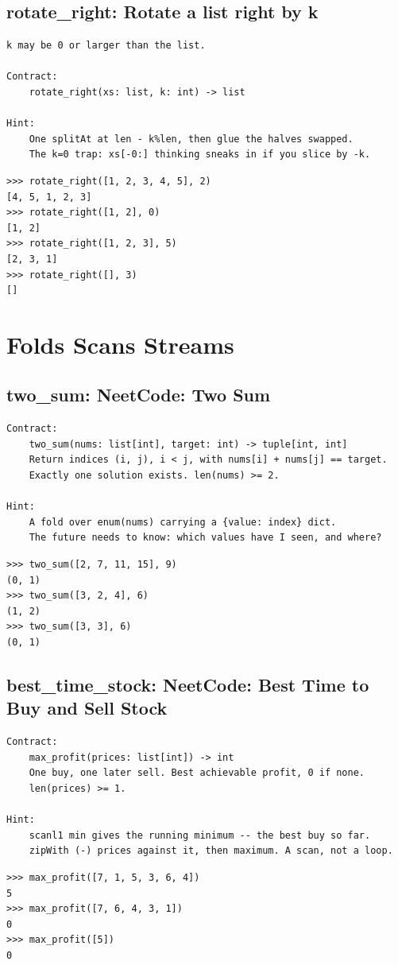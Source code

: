 \documentclass[10pt,letterpaper]{book}
\begin{document}
\section{rotate\_right: Rotate a list right by k}
\begin{lstlisting}[style=ex]
k may be 0 or larger than the list.

Contract:
    rotate_right(xs: list, k: int) -> list

Hint:
    One splitAt at len - k%len, then glue the halves swapped.
    The k=0 trap: xs[-0:] thinking sneaks in if you slice by -k.
\end{lstlisting}
\begin{lstlisting}[style=ex]
>>> rotate_right([1, 2, 3, 4, 5], 2)
[4, 5, 1, 2, 3]
>>> rotate_right([1, 2], 0)
[1, 2]
>>> rotate_right([1, 2, 3], 5)
[2, 3, 1]
>>> rotate_right([], 3)
[]
\end{lstlisting}
\chapter{Folds Scans Streams}

\section{two\_sum: NeetCode: Two Sum}
\begin{lstlisting}[style=ex]
Contract:
    two_sum(nums: list[int], target: int) -> tuple[int, int]
    Return indices (i, j), i < j, with nums[i] + nums[j] == target.
    Exactly one solution exists. len(nums) >= 2.

Hint:
    A fold over enum(nums) carrying a {value: index} dict.
    The future needs to know: which values have I seen, and where?
\end{lstlisting}
\begin{lstlisting}[style=ex]
>>> two_sum([2, 7, 11, 15], 9)
(0, 1)
>>> two_sum([3, 2, 4], 6)
(1, 2)
>>> two_sum([3, 3], 6)
(0, 1)
\end{lstlisting}

\section{best\_time\_stock: NeetCode: Best Time to Buy and Sell Stock}
\begin{lstlisting}[style=ex]
Contract:
    max_profit(prices: list[int]) -> int
    One buy, one later sell. Best achievable profit, 0 if none.
    len(prices) >= 1.

Hint:
    scanl1 min gives the running minimum -- the best buy so far.
    zipWith (-) prices against it, then maximum. A scan, not a loop.
\end{lstlisting}
\begin{lstlisting}[style=ex]
>>> max_profit([7, 1, 5, 3, 6, 4])
5
>>> max_profit([7, 6, 4, 3, 1])
0
>>> max_profit([5])
0
\end{lstlisting}
\end{document}
